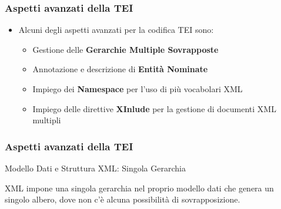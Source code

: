 
    \begin{frame}
        \frametitle{Aspetti avanzati della TEI}
        \addtocounter{nframe}{1}
        
    
        \begin{itemize}
            
            \item<1-> Alcuni degli aspetti avanzati per la codifica TEI sono:
                \begin{itemize}
                    \item<1-> Gestione delle \textbf{Gerarchie Multiple Sovrapposte}
                    \item<1-> Annotazione e descrizione di \textbf{Entità Nominate}
                    \item<1-> Impiego dei \textbf{Namespace} per l'uso di più vocabolari XML
                    \item<1-> Impiego delle direttive \textbf{XInlude} per la gestione 
                     di documenti XML multipli
                \end{itemize} 
           
        \end{itemize}
        
    \end{frame}

    \begin{frame}
        \frametitle{Aspetti avanzati della TEI}
        \addtocounter{nframe}{1}
        
    
        \begin{block}{Modello Dati e Struttura XML: Singola Gerarchia}
            
            XML impone una singola gerarchia nel proprio modello dati che genera un singolo albero, dove non c’è alcuna possibilità di sovrapposizione.
           
        \end{block}
        
    \end{frame}


